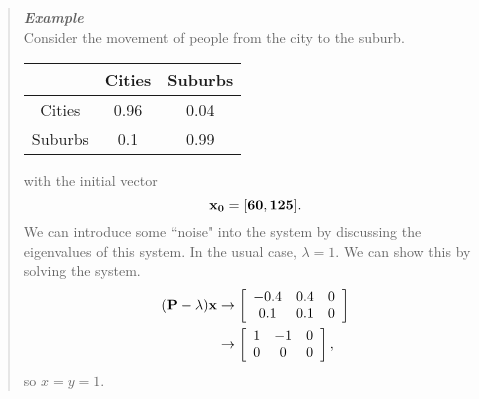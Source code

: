 \documentclass{hw}
\begin{document}
\begin{quote}
\textit{\textbf{Example}}\\
Consider the movement of people from the city to the suburb.
\begin{center}
\begin{tabular}{c | c c}
& Cities & Suburbs\\
\hline
Cities & 0.96 & 0.04\\
Suburbs & 0.1 & 0.99
\end{tabular}
\end{center}
with the initial vector
\[
\bf{x}_{0}=[60,125].
\]
We can introduce some ``noise" into the system by discussing the eigenvalues of this system. In the
usual case, $\lambda=1$. We can show this by solving the system.
\begin{align*}
(\bf{P}-\lambda)\bf{x}&\to
\left[
\begin{array}{c c c}
-0.4 & 0.4 & 0\\
0.1 & 0.1 & 0
\end{array}
\right]\\
&\to
\left[
\begin{array}{c c c}
1 & -1 & 0\\
0 & 0  & 0
\end{array}
\right],
\end{align*}
so $x=y=1$.
\end{quote}
\end{document}
